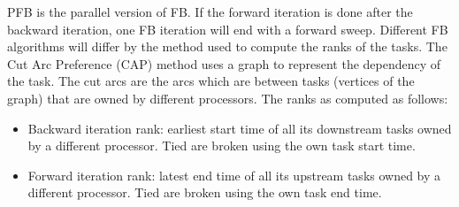 \documentclass[letterpaper]{article}
\renewcommand{\(}{\left(}
\renewcommand{\)}{\right)}
\renewcommand{\[}{\left[}
\renewcommand{\]}{\right]}
\begin{document}
PFB is the parallel version of FB. If the forward iteration is done after the
backward iteration, one
FB iteration will end with a forward sweep. Different FB
algorithms will differ by the method used to compute the ranks of the tasks. The
Cut Arc Preference (CAP) method uses a graph to represent the dependency of the
task. The cut arcs are the arcs which are between tasks (vertices of the
graph) that are owned by different processors. The ranks as computed as follows:
\begin{itemize}
  \item Backward iteration rank: earliest start time of all its downstream tasks
    owned by a different processor. Tied are broken using the own task start time.
  \item Forward iteration rank: latest end time of all its upstream tasks owned
    by a different processor. Tied are broken using the own task end time.
\end{itemize}
\end{document}
